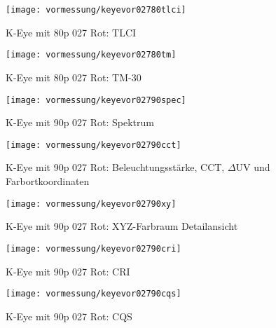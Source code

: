\documentclass[pagesize,paper=A4,fontsize=12pt,utf8,numbers=noenddot,bibliography=totoc,listof=totoc,DIV=11,BCOR=1mm]{scrreprt}
\begin{document}
\begin{figure}[htp]     %
\centering
\texttt{[image: vormessung/keyevor02780tlci]} 
\caption {K-Eye mit 80p 027 Rot: TLCI} 
\end{figure}

\begin{figure}[htp]     %
\centering
\texttt{[image: vormessung/keyevor02780tm]} 
\caption {K-Eye mit 80p 027 Rot: TM-30} 
\end{figure}




\begin{figure}[htp]     %
\centering
\texttt{[image: vormessung/keyevor02790spec]} 
\caption {K-Eye mit 90p 027 Rot: Spektrum} 
\end{figure}

\begin{figure}[htp]     %
\centering
\texttt{[image: vormessung/keyevor02790cct]} 
\caption {K-Eye mit 90p 027 Rot: Beleuchtungsstärke, CCT, $\Delta$UV und Farbortkoordinaten} 
\end{figure}

\begin{figure}[htp]     %
\centering
\texttt{[image: vormessung/keyevor02790xy]} 
\caption {K-Eye mit 90p 027 Rot: XYZ-Farbraum Detailansicht} 
\end{figure}

\begin{figure}[htp]     %
\centering
\texttt{[image: vormessung/keyevor02790cri]} 
\caption {K-Eye mit 90p 027 Rot: CRI} 
\end{figure}

\begin{figure}[htp]     %
\centering
\texttt{[image: vormessung/keyevor02790cqs]} 
\caption {K-Eye mit 90p 027 Rot: CQS} 
\end{figure}
\end{document}
